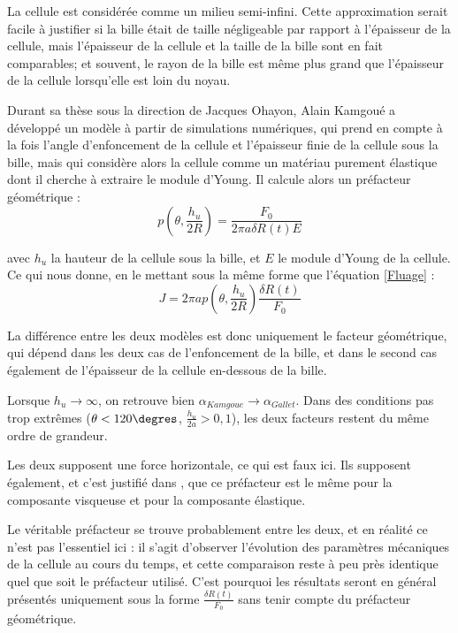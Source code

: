 	La cellule est considérée comme un milieu semi-infini. 
	Cette approximation serait facile à justifier si la bille était de taille négligeable par rapport à l'épaisseur de la cellule, mais l'épaisseur de la cellule et la taille de la bille sont en fait comparables; et souvent, le rayon de la bille est même plus grand que l'épaisseur de la cellule lorsqu'elle est loin du noyau. 

	
	Durant sa thèse sous la direction de Jacques Ohayon, Alain Kamgoué a développé un modèle à partir de simulations numériques, qui prend en compte à la fois l'angle d'enfoncement de la cellule et l'épaisseur finie de la cellule sous la bille, mais qui considère alors la cellule comme un matériau purement élastique dont il cherche à extraire le module d'Young. Il calcule alors un préfacteur géométrique : 
$$ p \left(\theta,\frac{h_u}{2R}\right)=\frac{ F_0}{2 \pi a \delta R(t) E} $$

avec $h_u$ la hauteur de la cellule sous la bille, et $E$ le module d'Young de la cellule. Ce qui nous donne, en le mettant sous la même forme que l'équation \ref{Fluage} : 
\begin{equation}
J= 2 \pi a p\left(\theta,\frac{h_u}{2R}\right) \frac{\delta R(t)}{F_0}
\label{Kamgoué}
\end{equation} 

La différence entre les deux modèles est donc uniquement le facteur géométrique, qui dépend dans les deux cas de l'enfoncement de la bille, et dans le second cas également de l'épaisseur de la cellule en-dessous de la bille.

Lorsque $h_u \rightarrow \infty$, on retrouve bien $\alpha_{Kamgoue} \rightarrow \alpha_{Gallet}$. Dans des conditions pas trop extrêmes ($\theta<120\degres $, $\frac{h_u}{2a}>0,1$), les deux facteurs restent du même ordre de grandeur. 

Les deux supposent une force horizontale, ce qui est faux ici. Ils supposent également, et c'est justifié dans \cite{laurent_assessment_2002}, que ce préfacteur est le même pour la composante visqueuse et pour la composante élastique. 

Le véritable préfacteur se trouve probablement entre les deux, et en réalité ce n'est pas l'essentiel ici : il s'agit d'observer l'évolution des paramètres mécaniques de la cellule au cours du temps, et cette comparaison reste à peu près identique quel que soit le préfacteur utilisé. 
C'est pourquoi les résultats seront en général présentés uniquement sous la forme $\frac{\delta R(t)}{F_0}$ sans tenir compte du préfacteur géométrique. 


